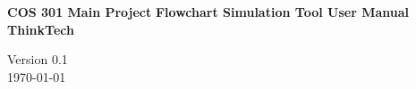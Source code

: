 \begin{titlepage}
	\begin{center}
		
		\begin{figure}[t]
			\centering
		\end{figure}		
	
	
	\begin{flushright} 
		
		\textbf{\LARGE COS 301 Main Project}
		\newline \newline \newline
		\textbf{\LARGE Flowchart Simulation Tool User Manual}
		\newline \newline \newline
 		\textbf{\LARGE ThinkTech}
		\newline \newline \newline
	\end{flushright}
		
		\vspace{1 cm}
		
		

		\begin{flushright} \large
		\end{flushright}
		
	
		
		
		\vfill
		
		{\LARGE Version 0.1}
		\\
		{\large \today}		
		
		
	\end{center}
\end{titlepage}

